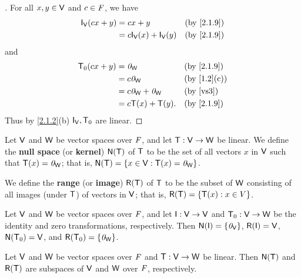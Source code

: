 \begin{proof}[]
	For all \(x, y \in \mathsf{V}\) and \(c \in \mathit{F}\), we have
	\begin{align*}
		\IT[\V](cx + y) & = cx + y                    &  & \by{2.1.9} \\
		                & = c \IT[\V](x) + \IT[\V](y) &  & \by{2.1.9}
	\end{align*}
	and
	\begin{align*}
		\zT(cx + y) & = \zv_{\W}              &  & \by{2.1.9}            \\
		            & = c \zv_{\W}            &  & \by{1.2}[c]           \\
		            & = c \zv_{\W} + \zv_{\W} &  & \text{(by \ref{vs3})} \\
		            & = c\T(x) + \T(y).       &  & \by{2.1.9}
	\end{align*}
	Thus by \cref{2.1.2}(b) \(\IT[\V], \zT\) are linear.
\end{proof}

\begin{defn}\label{2.1.10}
	Let \(\mathsf{V}\) and \(\mathsf{W}\) be vector spaces over \(\mathit{F}\), and let \(\mathsf{T} : \mathsf{V} \to \mathsf{W}\) be linear.
	We define the \textbf{null space} (or \textbf{kernel}) \(\ns{\T}\) of \(\mathsf{T}\) to be the set of all vectors \(x\) in \(\mathsf{V}\) such that \(\mathsf{T}(x) = \mathit{0}_{\mathsf{W}}\);
	that is, \(\ns{\T} = \set{x \in \V : \T(x) = \zv_{\W}}\).

	We define the \textbf{range} (or \textbf{image}) \(\rg{\T}\) of \(\mathsf{T}\) to be the subset of \(\mathsf{W}\) consisting of all images (under \(\mathsf{T}\)) of vectors in \(\mathsf{V}\);
	that is, \(\rg{\T} = \set{\T(x) : x \in V}\).
\end{defn}

\begin{eg}\label{2.1.11}
	Let \(\mathsf{V}\) and \(\mathsf{W}\) be vector spaces over \(\mathit{F}\), and let \(\IT : \V \to \V\) and \(\mathsf{T}_0 : \mathsf{V} \to \mathsf{W}\) be the identity and zero transformations, respectively.
	Then \(\ns{\IT} = \set{\zv_{\V}}\), \(\rg{\IT} = \V\), \(\ns{\zT} = \V\), and \(\rg{\zT} = \set{\zv_{\W}}\).
\end{eg}

\begin{thm}\label{2.1}
	Let \(\mathsf{V}\) and \(\mathsf{W}\) be vector spaces over \(\mathit{F}\) and \(\mathsf{T} : \mathsf{V} \to \mathsf{W}\) be linear.
	Then \(\ns{\T}\) and \(\rg{\T}\) are subspaces of \(\mathsf{V}\) and \(\mathsf{W}\) over \(\mathit{F}\), respectively.
\end{thm}

